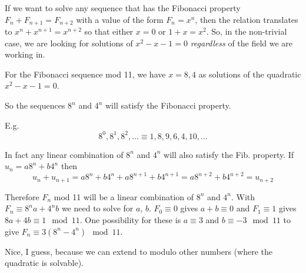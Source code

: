 \documentclass[11pt]{amsart}
\begin{document}
If we want to solve  any sequence that has the Fibonacci property $F_n + F_{n+1} = F_{n+2}$ with a value of the form $F_{n} = x^{n}$, then the relation translates to $x^{n} + x^{n+1} = x^{n+2}$ so that either $x=0$  or $1 + x = x^{2}$. So, in the non-trivial case, we are looking for solutions of $x^{2} - x - 1 = 0$ \emph{regardless} of the field we are working in.

For the Fibonacci sequence mod 11, we have $x = 8,4$ as solutions of the quadratic $x^{2} - x - 1 = 0$. 

So the sequences $8^{n}$ and $4^{n}$ will satisfy the Fibonacci property. 

E.g.
$$
8^{0}, 8^{1}, 8^{2}, \ldots \equiv 1, 8, 9, 6, 4, 10, \ldots
$$


In fact any linear combination of $8^{n}$ and $4^{n}$ will also satisfy the Fib. property. If $u_{n} = a 8^{n} + b 4^{n}$ then 
$$
u_{n} + u_{n+1} = a 8^{n} + b 4^{n} + a 8^{n+1} + b 4^{n+1} = a 8^{n+2} +  b 4^{n+2} = u_{n+2}
$$

Therefore $F_{n}$ mod 11 will  be a linear combination of $8^{n}$ and $4^{n}$. With $F_{n} \equiv  8^{n}a +  4^{n}b$ we need to solve for $a$, $b$. $F_{0} \equiv 0$ gives  $a + b \equiv 0$ and $F_{1} \equiv 1$ gives $8a + 4b \equiv 1 \mod 11$. One possibility for these is $a \equiv 3 $ and  $b \equiv -3 \mod 11$ to give $F_{n} \equiv 3 (8^{n} - 4^{n}) \mod 11$.


Nice, I guess, because we can extend to modulo other numbers (where the quadratic is solvable).
\end{document}
